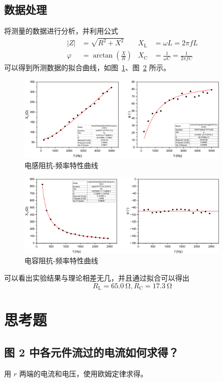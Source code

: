 \documentclass[a4paper,utf8]{article}
\begin{document}
\subsection{数据处理}
将测量的数据进行分析，并利用公式
\begin{align*}
    \left|Z\right|&=\sqrt{R^2+X^2} & X_\text{L} &=\omega L= 2\pi f L\\
    \varphi&=\arctan\left(\frac X R\right) & X_\text{C} &= \frac{1}{\omega C}=\frac{1}{2\pi f C}
\end{align*}
可以得到所测数据的拟合曲线，如图~\ref{fig:11.inductor}、图~\ref{fig:11.capacitor} 所示。
\begin{figure}[!ht]
    \caption{电感阻抗-频率特性曲线\label{fig:11.inductor}}
    \includegraphics[width=0.9\textwidth]{Inductor.png}
\end{figure}
\begin{figure}[!ht]
    \caption{电容阻抗-频率特性曲线\label{fig:11.capacitor}}
    \includegraphics[width=0.9\textwidth]{Capacitor.png}
\end{figure}\par
可以看出实验结果与理论相差无几，并且通过拟合可以得出
\begin{equation*}
    R_\text{L}=\SI{65.0}{\ohm}, R_\text{C}=\SI{17.3}{\ohm}
\end{equation*}
\section{思考题}
\subsection{图 2 中各元件流过的电流如何求得？}
用 $r$ 两端的电流和电压，使用欧姆定律求得。
\end{document}
